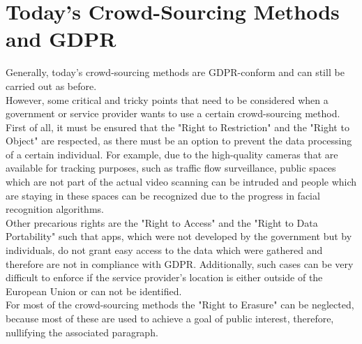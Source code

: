 \documentclass[a4paper,12pt]{report}
\begin{document}
	\section{Today's Crowd-Sourcing Methods and GDPR} \label{juxtaposition}
	\startsection
		Generally, today's crowd-sourcing methods are GDPR-conform and can still be carried out as before. \\
		However, some critical and tricky points that need to be considered when a government or service provider wants to use a certain crowd-sourcing method. \\
		First of all, it must be ensured that the "Right to Restriction" and the "Right to Object" are respected, as there must be an option to prevent the data processing of a certain individual. For example, due to the high-quality cameras that are available for tracking purposes, such as traffic flow surveillance, public spaces which are not part of the actual video scanning can be intruded and people which are staying in these spaces can be recognized due to the progress in facial recognition algorithms. \\
		Other precarious rights are the "Right to Access" and the "Right to Data Portability" such that apps, which were not developed by the government but by individuals, do not grant easy access to the data which were gathered and therefore are not in compliance with GDPR. Additionally, such cases can be very difficult to enforce if the service provider's location is either outside of the European Union or can not be identified. \\
		For most of the crowd-sourcing methods the "Right to Erasure" can be neglected, because most of these are used to achieve a goal of public interest, therefore, nullifying the associated paragraph.
	\closesection
	
\end{document}
